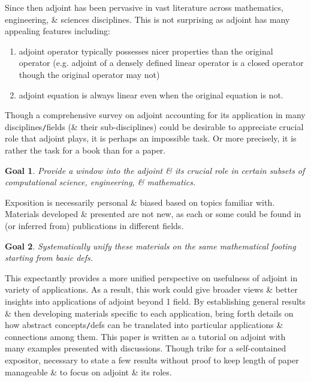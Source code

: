 \documentclass{article}
\newtheorem{goal}{Goal}
\begin{document}
\begin{enumerate}
\begin{itemize}
		Since then adjoint has been pervasive in vast literature across mathematics, engineering, \& sciences disciplines. This is not surprising as adjoint has many appealing features including:
		\begin{enumerate}
			\item adjoint operator typically possesses nicer properties than the original operator (e.g. adjoint of a densely defined linear operator is a closed operator though the original operator may not)
			\item adjoint equation is always linear even when the original equation is not.
		\end{enumerate}
		Though a comprehensive survey on adjoint accounting for its application in many disciplines{\tt/}fields (\& their sub-disciplines) could be desirable to appreciate crucial role that adjoint plays, it is perhaps an impossible task. Or more precisely, it is rather the task for a book than for a paper.
		\begin{goal}
			Provide a window into the adjoint \& its crucial role in certain subsets of computational science, engineering, \& mathematics.
		\end{goal}
		Exposition is necessarily personal \& biased based on topics familiar with. Materials developed \& presented are not new, as each or some could be found in (or inferred from) publications in different fields.
		\begin{goal}
			Systematically unify these materials on the same mathematical footing starting from basic defs.
		\end{goal}
		This expectantly provides a more unified perspective on usefulness of adjoint in variety of applications. As a result, this work could give broader views \& better insights into applications of adjoint beyond 1 field. By establishing general results \& then developing materials specific to each application, bring forth details on how abstract concepts{\tt/}defs can be translated into particular applications \& connections among them. This paper is written as a tutorial on adjoint with many examples presented with discussions. Though trike for a self-contained expositor, necessary to state a few results without proof to keep length of paper manageable \& to focus on adjoint \& its roles.


\end{itemize}
\end{enumerate}
\end{document}
